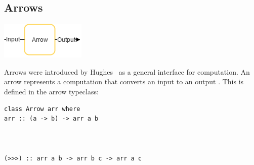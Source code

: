 \subsection{Arrows}
\label{sec:arrows}
\begin{center}
	\includegraphics[]{images/arrow.png}
\end{center}
Arrows were introduced by Hughes \citHughes\ as a general interface for computation. An arrow  represents  a computation that converts an input  to an output . This is defined in the arrow typeclass:

\begin{minipage}{\textwidth}
\begin{minipage}{0.5\textwidth}
\begin{lstlisting}[frame=htrbl]
class Arrow arr where
arr :: (a -> b) -> arr a b



(>>>) :: arr a b -> arr b c -> arr a c





\end{lstlisting}
\end{minipage}
\end{minipage}

